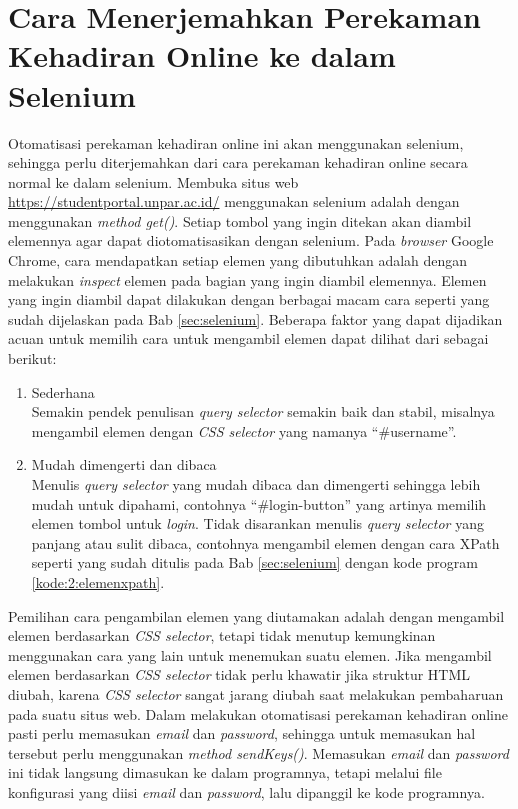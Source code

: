 \section{Cara Menerjemahkan Perekaman Kehadiran Online ke dalam Selenium}
\label{sec:terjemah} 
Otomatisasi perekaman kehadiran online ini akan menggunakan selenium, sehingga perlu diterjemahkan dari cara perekaman kehadiran online secara normal ke dalam selenium. Membuka situs web \url{https://studentportal.unpar.ac.id/} menggunakan selenium adalah dengan menggunakan \textit{method get()}. Setiap tombol yang ingin ditekan akan diambil elemennya agar dapat diotomatisasikan dengan selenium. Pada \textit{browser} Google Chrome, cara mendapatkan setiap elemen yang dibutuhkan adalah dengan melakukan \textit{inspect} elemen pada bagian yang ingin diambil elemennya. Elemen yang ingin diambil dapat dilakukan dengan berbagai macam cara seperti yang sudah dijelaskan pada Bab \ref{sec:selenium}. Beberapa faktor yang dapat dijadikan acuan untuk memilih cara untuk mengambil elemen dapat dilihat dari sebagai berikut:
\begin{enumerate}
	\item Sederhana \\
	Semakin pendek penulisan \textit{query selector} semakin baik dan stabil, misalnya mengambil elemen dengan \textit{CSS selector} yang namanya ``#username''.
 	\item Mudah dimengerti dan dibaca \\
 	Menulis \textit{query selector} yang mudah dibaca dan dimengerti sehingga lebih mudah untuk dipahami, contohnya ``#login-button'' yang artinya memilih elemen tombol untuk \textit{login}. Tidak disarankan menulis \textit{query selector} yang panjang atau sulit dibaca, contohnya mengambil elemen dengan cara XPath seperti yang sudah ditulis pada Bab \ref{sec:selenium} dengan kode program \ref{kode:2:elemenxpath}.
\end{enumerate}
Pemilihan cara pengambilan elemen yang diutamakan adalah dengan mengambil elemen berdasarkan \textit{CSS selector}, tetapi tidak menutup kemungkinan menggunakan cara yang lain untuk menemukan suatu elemen. Jika mengambil elemen berdasarkan \textit{CSS selector} tidak perlu khawatir jika struktur HTML diubah, karena \textit{CSS selector} sangat jarang diubah saat melakukan pembaharuan pada suatu situs web. 
Dalam melakukan otomatisasi perekaman kehadiran online pasti perlu memasukan \textit{email} dan \textit{password}, sehingga untuk memasukan hal tersebut perlu menggunakan \textit{method sendKeys()}. Memasukan \textit{email} dan \textit{password} ini tidak langsung dimasukan ke dalam programnya, tetapi melalui file konfigurasi yang diisi \textit{email} dan \textit{password}, lalu dipanggil ke kode programnya. 


